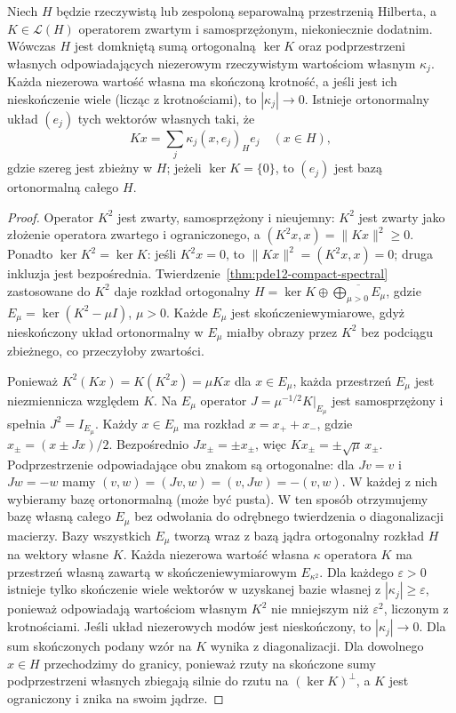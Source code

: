 \begin{twierdzenie}
\label{thm:pde12-compact-general-spectral}
Niech $H$ będzie rzeczywistą lub zespoloną separowalną
przestrzenią Hilberta, a $K\in\mathcal L(H)$ operatorem
zwartym i samosprzężonym, niekoniecznie dodatnim.
Wówczas $H$ jest domkniętą sumą ortogonalną $\ker K$ oraz
podprzestrzeni własnych odpowiadających niezerowym
rzeczywistym wartościom własnym $\kappa_j$.
Każda niezerowa wartość własna ma skończoną krotność,
a jeśli jest ich nieskończenie wiele (licząc z krotnościami),
to $|\kappa_j|\to0$. Istnieje ortonormalny układ
$(e_j)$ tych wektorów własnych taki, że
\[
 Kx=\sum_j\kappa_j(x,e_j)_He_j\quad(x\in H),
\]
gdzie szereg jest zbieżny w $H$; jeżeli $\ker K=\{0\}$,
to $(e_j)$ jest bazą ortonormalną całego $H$.
\end{twierdzenie}
\begin{proof}
Operator $K^2$ jest zwarty, samosprzężony i nieujemny:
$K^2$ jest zwarty jako złożenie operatora zwartego
i ograniczonego, a $(K^2x,x)=\|Kx\|^2\ge0$.
Ponadto $\ker K^2=\ker K$: jeśli $K^2x=0$, to
$\|Kx\|^2=(K^2x,x)=0$; druga inkluzja jest bezpośrednia.
Twierdzenie~\ref{thm:pde12-compact-spectral} zastosowane
do $K^2$ daje rozkład ortogonalny
$H=\ker K\oplus\overline{\bigoplus_{\mu>0}E_\mu}$,
gdzie $E_\mu=\ker(K^2-\mu I)$, $\mu>0$.
Każde $E_\mu$ jest skończeniewymiarowe, gdyż nieskończony
układ ortonormalny w $E_\mu$ miałby obrazy przez $K^2$
bez podciągu zbieżnego, co przeczyłoby zwartości.

Ponieważ $K^2(Kx)=K(K^2x)=\mu Kx$ dla $x\in E_\mu$,
każda przestrzeń $E_\mu$ jest niezmiennicza względem $K$.
Na $E_\mu$ operator $J=\mu^{-1/2}K|_{E_\mu}$
jest samosprzężony i spełnia $J^2=I_{E_\mu}$.
Każdy $x\in E_\mu$ ma rozkład
$x=x_++x_-$, gdzie $x_\pm=(x\pm Jx)/2$.
Bezpośrednio $Jx_\pm=\pm x_\pm$, więc
$Kx_\pm=\pm\sqrt\mu\,x_\pm$.
Podprzestrzenie odpowiadające obu znakom są ortogonalne:
dla $Jv=v$ i $Jw=-w$ mamy
$(v,w)=(Jv,w)=(v,Jw)=-(v,w)$.
W każdej z nich wybieramy bazę ortonormalną
(może być pusta). W ten sposób otrzymujemy bazę własną
całego $E_\mu$ bez odwołania do odrębnego twierdzenia
o diagonalizacji macierzy.
Bazy wszystkich $E_\mu$ tworzą wraz z bazą jądra
ortogonalny rozkład $H$ na wektory własne $K$.
Każda niezerowa wartość własna $\kappa$ operatora $K$
ma przestrzeń własną zawartą w skończeniewymiarowym
$E_{\kappa^2}$. Dla każdego $\varepsilon>0$ istnieje
tylko skończenie wiele wektorów w uzyskanej bazie własnej
z $|\kappa_j|\ge\varepsilon$, ponieważ odpowiadają
wartościom własnym $K^2$ nie mniejszym niż
$\varepsilon^2$, liczonym z krotnościami.
Jeśli układ niezerowych modów jest nieskończony,
to $|\kappa_j|\to0$.
Dla sum skończonych podany wzór na $K$ wynika
z diagonalizacji. Dla dowolnego $x\in H$ przechodzimy
do granicy, ponieważ rzuty na skończone sumy podprzestrzeni
własnych zbiegają silnie do rzutu na $(\ker K)^\perp$,
a $K$ jest ograniczony i znika na swoim jądrze.
\end{proof}

